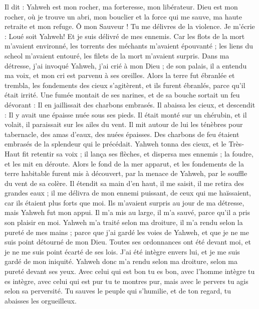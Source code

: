 \begin{multicols}{2}
Il dit : Yahweh est mon rocher, ma forteresse, mon libérateur.
Dieu est mon rocher, où je trouve un abri, mon bouclier et la force qui me sauve, ma haute retraite et mon refuge. Ô mon Sauveur ! Tu me délivres de la violence.
Je m'écrie : Loué soit Yahweh! Et je suis délivré de mes ennemis.
Car les flots de la mort m'avaient environné, les torrents des méchants m'avaient épouvanté ;
les liens du scheol m'avaient entouré, les filets de la mort m'avaient surpris.
Dans ma détresse, j'ai invoqué Yahweh, j'ai crié à mon Dieu ; de son palais, il a entendu ma voix, et mon cri est parvenu à ses oreilles.
Alors la terre fut ébranlée et trembla, les fondements des cieux s’agitèrent, et ils furent ébranlés, parce qu'il était irrité.
Une fumée montait de ses narines, et de sa bouche sortait un feu dévorant : Il en jaillissait des charbons embrasés.
Il abaissa les cieux, et descendit : Il y avait une épaisse nuée sous ses pieds.
Il était monté sur un chérubin, et il volait, il paraissait sur les ailes du vent.
Il mit autour de lui les ténèbres pour tabernacle, des amas d'eaux, des nuées épaisses.
Des charbons de feu étaient embrasés de la splendeur qui le précédait.
Yahweh tonna des cieux, et le Très-Haut fit retentir sa voix ;
il lança ses flèches, et dispersa mes ennemis ; la foudre, et les mit en déroute.
Alors le fond de la mer apparut, et les fondements de la terre habitable furent mis à découvert, par la menace de Yahweh, par le souffle du vent de sa colère.
Il étendit sa main d'en haut, il me saisit, il me retira des grandes eaux ;
il me délivra de mon ennemi puissant, de ceux qui me haïssaient, car ils étaient plus forts que moi.
Ils m'avaient surpris au jour de ma détresse, mais Yahweh fut mon appui.
Il m'a mis au large, il m'a sauvé, parce qu'il a pris son plaisir en moi.
Yahweh m'a traité selon ma droiture, il m'a rendu selon la pureté de mes mains ;
parce que j'ai gardé les voies de Yahweh, et que je ne me suis point détourné de mon Dieu.
Toutes ses ordonnances ont été devant moi, et je ne me suis point écarté de ses lois.
J'ai été intègre envers lui, et je me suis gardé de mon iniquité.
Yahweh donc m'a rendu selon ma droiture, selon ma pureté devant ses yeux.
Avec celui qui est bon tu es bon, avec l'homme intègre tu es intègre,
avec celui qui est pur tu te montres pur, mais avec le pervers tu agis selon sa perversité.
Tu sauves le peuple qui s’humilie, et de ton regard, tu abaisses les orgueilleux.

\end{multicols}
